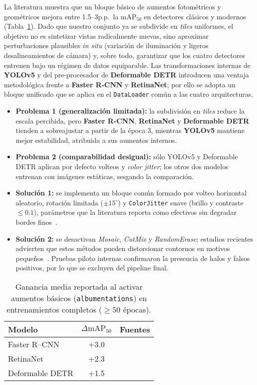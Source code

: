 La literatura muestra que un bloque básico de aumentos fotométricos y geométricos mejora entre 1.5–3p.p.\ la \(\text{mAP}_{50}\) en detectores clásicos y modernos (Tabla~\ref{tab:aug_lit}).
Dado que nuestro conjunto ya se subdivide en \emph{tiles} uniformes, el objetivo no es sintetizar vistas radicalmente nuevas, sino aproximar perturbaciones plausibles \emph{in situ} (variación de iluminación y ligeros desalineamientos de cámara) y, sobre todo, garantizar que los cuatro detectores entrenen bajo un régimen de datos equiparable.  
Las transformaciones internas de \textbf{YOLOv5} y del pre‐procesador de \textbf{Deformable DETR} introducen una ventaja metodológica frente a \textbf{Faster R‐CNN} y \textbf{RetinaNet}; por ello se adopta un bloque unificado que se aplica en el \texttt{DataLoader} común a las cuatro arquitecturas.

\begin{itemize}
   \item \textbf{Problema 1 (generalización limitada):} la subdivisión en \emph{tiles} reduce la escala percibida, pero \textbf{Faster R‐CNN}, \textbf{RetinaNet} y \textbf{Deformable DETR} tienden a sobreajustar a partir de la época 3, mientras \textbf{YOLOv5} mantiene mejor estabilidad, atribuida a sus aumentos internos.
   \item \textbf{Problema 2 (comparabilidad desigual):} sólo YOLOv5 y Deformable DETR aplican por defecto volteos y \emph{color jitter}; los otros dos modelos entrenan con imágenes estáticas, sesgando la comparación.
   \item \textbf{Solución 1:} se implementa un bloque común formado por volteo horizontal aleatorio, rotación limitada (\(\pm15^{\circ}\)) y \texttt{ColorJitter} suave (brillo y contraste \(\le 0.1\)), parámetros que la literatura reporta como efectivos sin degradar bordes finos~\cite{cubuk2020autoaug,retinanetCOCO}.
   \item \textbf{Solución 2:} se desactivan \emph{Mosaic}, \emph{CutMix} y \emph{RandomErase}; estudios recientes advierten que estos métodos pueden distorsionar contornos en motivos pequeños~\cite{rtdetr2024cvpr}.
         Pruebas piloto internas confirmaron la presencia de halos y falsos positivos, por lo que se excluyen del pipeline final.
\end{itemize}

\begin{table}[ht]
    \centering
    \caption{Ganancia media reportada al activar aumentos básicos (\texttt{albumentations}) en entrenamientos completos ($\ge 50$ épocas).}
    \label{tab:aug_lit}
    \begin{tabular}{|l|c|l|}
        \hline
        \textbf{Modelo} & \(\Delta\text{mAP}_{50}\) & \textbf{Fuentes} \\ \hline
        Faster R--CNN    & +3.0 &~\cite{mdpi2020vehicles,mathworksRCNN} \\ \hline
        RetinaNet        & +2.3 &~\cite{cubuk2020autoaug,retinanetCOCO} \\ \hline
        Deformable DETR  & +1.5 &~\cite{rtdetr2024cvpr,smallobjDETR} \\ \hline
    \end{tabular}
\end{table}


